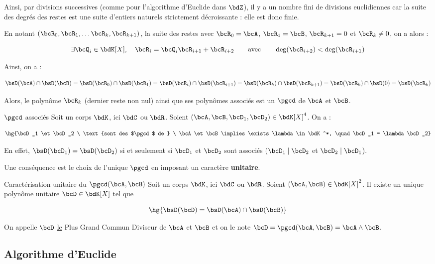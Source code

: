 \documentclass[a4paper,french,bookmarks]{article}
\begin{document}
Ainsi, par divisions successives (comme pour l'algorithme d'Euclide dans $\bdZ$), il y a un nombre fini de divisions euclidiennes car la suite des degrés des restes est une suite d'entiers naturels strictement décroissante : elle est donc finie.

En notant $(\bcR_0, \bcR_1, \dots \bcR_k, \bcR_{k+1})$, la suite des restes avec $\bcR_0 = \bcA$, $\bcR_1 = \bcB$, $\bcR_{k+1} = 0$ et $\bcR_k \neq 0$, on a alors :

\[ \exists \bcQ_i \in \bdK[X], \quad \bcR_i = \bcQ_i\bcR_{i+1} + \bcR_{i+2} \qquad\text{avec}\qquad \deg(\bcR_{i+2}) < \deg(\bcR_{i+1})\]

Ainsi, on a :

\[ \bsD(\bcA) \cap \bsD(\bcB) = \bsD(\bcR_0) \cap \bsD(\bcR_1) = \bsD(\bcR_i) \cap \bsD(\bcR_{i+1}) = \bsD(\bcR_k) \cap \bsD(\bcR_{k+1}) = \bsD(\bcR_k) \cap \bsD(0) = \bsD(\bcR_k) \]

Alors, le polynôme $\bcR_k$ (dernier reste non nul) ainsi que ses polynômes associés est un $\pgcd$ de $\bcA$ et $\bcB$.

\begin{corollary}{$\pgcd$ associés}{}
    Soit un corps $\bdK$, ici $\bdC$ ou $\bdR$. Soient $(\bcA, \bcB, \bcD_1, \bcD_2) \in \bdK[X]^4$. On a :
    
    \[ \hg{\bcD_1 \et \bcD_2 \ \text{sont des $\pgcd$ de } \ \bcA \et \bcB \implies \exists \lambda \in \bdK^*, \quad \bcD_1 = \lambda\bcD_2}\]
\end{corollary}

En effet, $\bsD(\bcD_1) = \bsD(\bcD_2)$ si et seulement si $\bcD_1$ et $\bcD_2$ sont associés ($\bcD_1 \mid \bcD_2$ et $\bcD_2 \mid \bcD_1$).

Une conséquence est le choix de l'unique $\pgcd$ en imposant un caractère \textbf{unitaire}.

\begin{property}{Caractérisation unitaire du $\pgcd(\bcA, \bcB)$}
    Soit un corps $\bdK$, ici $\bdC$ ou $\bdR$. Soient $(\bcA, \bcB) \in \bdK[X]^2$. Il existe un unique polynôme unitaire $\bcD \in \bdK[X]$ tel que 
    
    \[ \hg{\bsD(\bcD) = \bsD(\bcA) \cap \bsD(\bcB)}\]
\end{property}

On appelle $\bcD$ \underline{le} Plus Grand Commun Diviseur de $\bcA$ et $\bcB$ et on le note $\bcD = \pgcd(\bcA, \bcB) = \bcA \wedge \bcB$.

\subsection{Algorithme d'Euclide}
\end{document}
